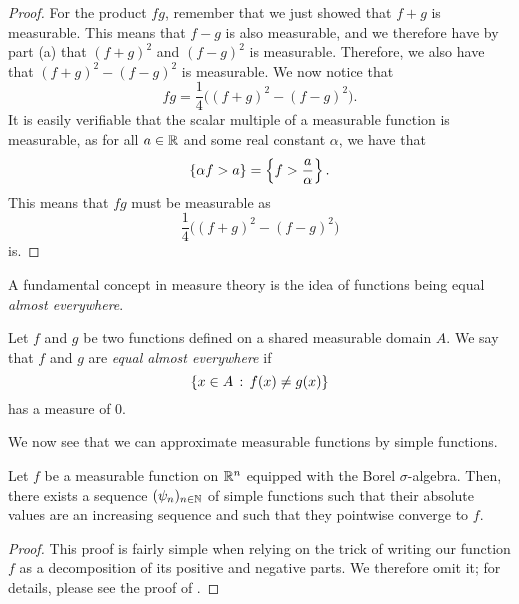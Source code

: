 \begin{proof}
  For the product $fg$, remember that we just showed that $f + g$ is measurable. This means that $f - g$ is also measurable, and we therefore have by part (a) that $(f+g)^2$ and $(f-g)^2$ is measurable. Therefore, we also have that $(f+g)^2 - (f - g)^2$ is measurable. We now notice that
  \begin{equation*}
    fg = \frac{1}{4} \big( (f+g)^2 - (f - g)^2  \big).
  \end{equation*}
  It is easily verifiable that the scalar multiple of a measurable function is measurable, as for all $a \in \mathbb{R}$ and some real constant $\alpha$, we have that
  \begin{equation*}
    \left\{\alpha f > a \right\} = \left\{f > \frac{a}{\alpha}\right\}.
  \end{equation*}
  This means that $fg$ must be measurable as
  \begin{equation*}
    \frac{1}{4} \big( (f+g)^2 - (f - g)^2  \big)
  \end{equation*}
  is.
\end{proof}

A fundamental concept in measure theory is the idea of functions being equal {\emph{almost everywhere}}.

\begin{definition}
  Let $f$ and $g$ be two functions defined on a shared measurable domain $A$. We say that $f$ and $g$ are {\emph{equal almost everywhere}} if
  \begin{equation*}
    \left\{x \in A \,:\, f(x) \neq g(x)\right\}
  \end{equation*}
  has a measure of 0.
\end{definition}

We now see that we can approximate measurable functions by simple functions.

\begin{theorem}\label{lbl_thrm_measurable_simple_approx}
  Let $f$ be a measurable function on $\mathbb{R}^n$ equipped with the Borel $\sigma$-algebra. Then, there exists a sequence $(\psi_n)_{n \in \mathbb{N}}$ of simple functions such that their absolute values are an increasing sequence and such that they pointwise converge to $f$.
\end{theorem}
\begin{proof}
  This proof is fairly simple when relying on the trick of writing our function $f$ as a decomposition of its positive and negative parts. We therefore omit it; for details, please see the proof of {\cite[Chapter 1, Theorem 4.2]{stein}}.
\end{proof}

